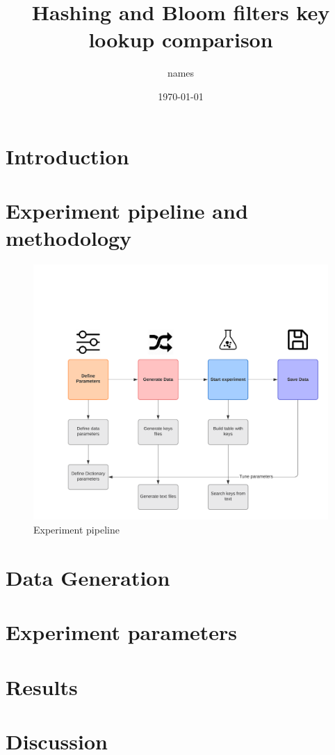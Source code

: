 \documentclass{article}
\title{Hashing and Bloom filters key lookup comparison}
\author{names}
\date{\today}
\begin{document}
    \maketitle
    \thispagestyle{empty}
    \begin{abstract}
        \lipsum[1]
    \end{abstract}


    \section*{Introduction}
        \lipsum[2]

    \section*{Experiment pipeline and methodology}
        \lipsum[1]
	\begin{figure}
	  \includegraphics[width=\linewidth]{experiment_pipeline.png}
	  \caption{Experiment pipeline}
	  \label{fig:Pipeline}
	\end{figure}
	\lipsum[1]
    \section*{Data Generation}
        \lipsum[1]
    \section*{Experiment parameters}
        \lipsum[1]
    \section*{Results}

    \section*{Discussion}
        \lipsum[1]


    \printbibliography
\end{document}
